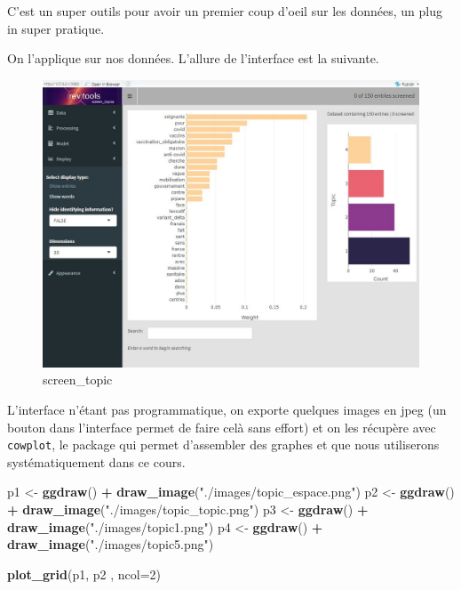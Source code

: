 \documentclass[
]{book}
\newenvironment{Shaded}{\begin{snugshade}}{\end{snugshade}}
\newcommand{\DataTypeTok}[1]{\textcolor[rgb]{0.13,0.29,0.53}{#1}}
\newcommand{\DecValTok}[1]{\textcolor[rgb]{0.00,0.00,0.81}{#1}}
\newcommand{\KeywordTok}[1]{\textcolor[rgb]{0.13,0.29,0.53}{\textbf{#1}}}
\newcommand{\NormalTok}[1]{#1}
\newcommand{\OperatorTok}[1]{\textcolor[rgb]{0.81,0.36,0.00}{\textbf{#1}}}
\newcommand{\StringTok}[1]{\textcolor[rgb]{0.31,0.60,0.02}{#1}}
\begin{document}
C'est un super outils pour avoir un premier coup d'oeil sur les données, un plug in super pratique.

On l'applique sur nos données. L'allure de l'interface est la suivante.

\begin{figure}
\centering
\includegraphics{./images/LDA_revtools.jpg}
\caption{screen\_topic}
\end{figure}

L'interface n'étant pas programmatique, on exporte quelques images en jpeg (un bouton dans l'interface permet de faire celà sans effort) et on les récupère avec \texttt{cowplot}, le package qui permet d'assembler des graphes et que nous utiliserons systématiquement dans ce cours.

\begin{Shaded}
\begin{Highlighting}[]
\NormalTok{p1 <-}\StringTok{ }\KeywordTok{ggdraw}\NormalTok{() }\OperatorTok{+}\StringTok{ }\KeywordTok{draw_image}\NormalTok{(}\StringTok{"./images/topic_espace.png"}\NormalTok{)}
\NormalTok{p2 <-}\StringTok{ }\KeywordTok{ggdraw}\NormalTok{() }\OperatorTok{+}\StringTok{ }\KeywordTok{draw_image}\NormalTok{(}\StringTok{"./images/topic_topic.png"}\NormalTok{)}
\NormalTok{p3 <-}\StringTok{ }\KeywordTok{ggdraw}\NormalTok{() }\OperatorTok{+}\StringTok{ }\KeywordTok{draw_image}\NormalTok{(}\StringTok{"./images/topic1.png"}\NormalTok{)}
\NormalTok{p4 <-}\StringTok{ }\KeywordTok{ggdraw}\NormalTok{() }\OperatorTok{+}\StringTok{ }\KeywordTok{draw_image}\NormalTok{(}\StringTok{"./images/topic5.png"}\NormalTok{)}

\KeywordTok{plot_grid}\NormalTok{(p1, p2 , }\DataTypeTok{ncol=}\DecValTok{2}\NormalTok{)}
\end{Highlighting}
\end{Shaded}
\end{document}
